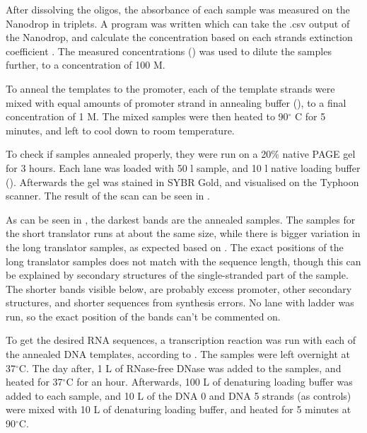 After dissolving the oligos, the absorbance of each sample was measured on the Nanodrop in triplets. A program was written which can take the .csv output of the Nanodrop, and calculate the concentration based on each strands extinction coefficient \cite{nanodropimport}. The measured concentrations () was used to dilute the samples further, to a concentration of 100 \si{\micro}M.

To anneal the templates to the promoter, each of the template strands were mixed with equal amounts of promoter strand in annealing buffer (), to a final concentration of 1 \si{\micro}M. The mixed samples were then heated to 90$^\circ$ C for 5 minutes, and left to cool down to room temperature.

To check if samples annealed properly, they were run on a 20\% native PAGE gel for 3 hours. Each lane was loaded with 50 \si{\micro}l sample, and 10 \si{\micro}l native loading buffer (). Afterwards the gel was stained in SYBR Gold, and visualised on the Typhoon scanner. The result of the scan can be seen in .

As can be seen in , the darkest bands are the annealed samples. The samples for the short translator runs at about the same size, while there is bigger variation in the long translator samples, as expected based on . The exact positions of the long translator samples does not match with the sequence length, though this can be explained by secondary structures of the single-stranded part of the sample. The shorter bands visible below, are probably excess promoter, other secondary structures, and shorter sequences from synthesis errors. No lane with ladder was run, so the exact position of the bands can't be commented on.

To get the desired RNA sequences, a transcription reaction was run with each of the annealed DNA templates, according to . The samples were left overnight at 37$^\circ$C. The day after, 1 \si{\micro}L of RNase-free DNase was added to the samples, and heated for 37$^\circ$C for an hour. Afterwards, 100 \si{\micro}L of denaturing loading buffer was added to each sample, and 10 \si{\micro}L of the DNA 0 and DNA 5 strands (as controls) were mixed with 10 \si{\micro}L of denaturing loading buffer, and heated for 5 minutes at 90$^\circ$C.

